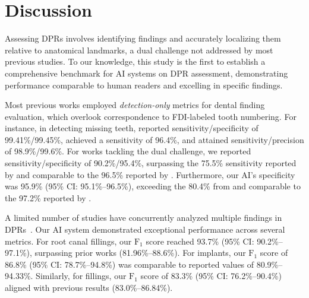 \section{Discussion}

Assessing DPRs involves identifying findings and accurately localizing them relative to anatomical landmarks, a dual challenge not addressed by most previous studies. 
To our knowledge, this study is the first to establish a comprehensive benchmark for AI systems on DPR assessment, demonstrating performance comparable to human readers and excelling in specific findings.



Most previous works employed \emph{detection-only} metrics for dental finding evaluation, which overlook correspondence to FDI-labeled tooth numbering. 
For instance, in detecting missing teeth, \citet{tuzoff2019tooth} reported sensitivity/specificity of 99.41\%/99.45\%, \citet{muramatsu2021tooth} achieved a sensitivity of 96.4\%, and \citet{leite2021artificial} attained sensitivity/precision of 98.9\%/99.6\%.
For works tackling the dual challenge, we reported sensitivity/specificity of 90.2\%/95.4\%, surpassing the 75.5\% sensitivity reported by \citet{kim2020automatic} and comparable to the 96.5\% reported by \citet{vinayahalingam2021automated}.
Furthermore, our AI’s specificity was 95.9\% (95\% CI: 95.1\%--96.5\%), exceeding the 80.4\% from \citet{kim2020automatic} and comparable to the 97.2\% reported by \citet{chen2022missing}.

A limited number of studies have concurrently analyzed multiple findings in DPRs~\citep{vinayahalingam2021automated, bacsaran2022diagnostic, van2024combining}.
Our AI system demonstrated exceptional performance across several metrics.
For root canal fillings, our $\textrm{F}_1$ score reached 93.7\% (95\% CI: 90.2\%--97.1\%), surpassing prior works (81.96\%--88.6\%).
For implants, our $\textrm{F}_1$ score of 86.8\% (95\% CI: 78.7\%--94.8\%) was comparable to reported values of 80.9\%--94.33\%. Similarly, for fillings, our $\textrm{F}_1$ score of 83.3\% (95\% CI: 76.2\%--90.4\%) aligned with previous results (83.0\%--86.84\%).

